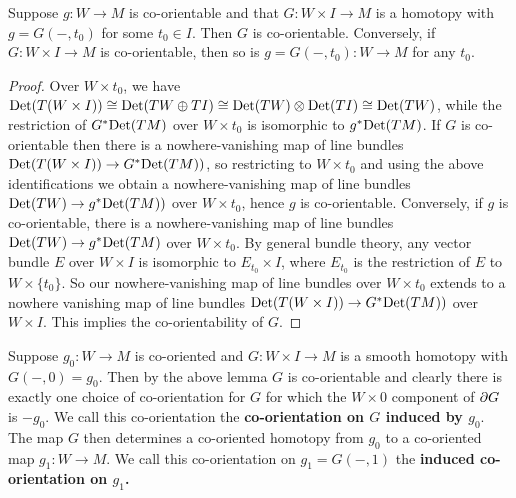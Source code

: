 \begin{lemma}\label{L: co-orientable homotopies}
	Suppose $g \colon W \to M$ is co-orientable and that $G \colon W \times I \to M$ is a homotopy with $g = G(-,t_0)$ for some $t_0 \in I$.
	Then $G$ is co-orientable.
	Conversely, if $G \colon W \times I \to M$ is co-orientable, then so is $g = G(-,t_0) \colon W \to M$ for any $t_0$.
\end{lemma}

\begin{proof}
	Over $W \times t_0$, we have ${\rm Det}(T(W \times I)) \cong {\rm Det}(TW \oplus TI) \cong {\rm Det}(TW) \otimes {\rm Det} (TI) \cong {\rm Det}(TW)$, while the restriction of $G^*{\rm Det}(TM)$ over $W \times t_0$ is isomorphic to $g^*{\rm Det}(TM)$.
	If $G$ is co-orientable then there is a nowhere-vanishing map of line bundles ${\rm Det}(T(W \times I)) \to G^*{\rm Det}(TM))$, so restricting to $W \times t_0$ and using the above identifications we obtain a nowhere-vanishing map of line bundles ${\rm Det}(TW) \to g^*{\rm Det}(TM))$ over $W \times t_0$, hence $g$ is co-orientable.
	Conversely,
	if $g$ is co-orientable, there is a nowhere-vanishing map of line bundles ${\rm Det}(TW) \to g^*{\rm Det}(TM)$ over $W \times t_0$.
	By general bundle theory, any vector bundle $E$ over $W \times I$ is isomorphic to $E_{t_0} \times I$, where $E_{t_0}$ is the restriction of $E$ to $W \times \{t_0\}$.
	So our nowhere-vanishing map of line bundles over $W \times t_0$ extends to a nowhere vanishing map of line bundles ${\rm Det}(T(W \times I)) \to G^*{\rm Det}(TM))$ over $W \times I$.
	This implies the co-orientability of $G$.
\end{proof}

\begin{definition}\label{D: homotopy co-orientation}
	Suppose $g_0 \colon W \to M$ is co-oriented and $G \colon W \times I \to M$ is a smooth homotopy with $G(-,0) = g_0$.
	Then by the above lemma $G$ is co-orientable and clearly there is exactly one choice of co-orientation for $G$ for which the $W \times 0$ component of $\partial G$ is $-g_0$.
	We call this co-orientation the \textbf{co-orientation on $G$ induced by $g_0$}.
	The map $G$ then determines a co-oriented homotopy from $g_0$ to a co-oriented map $g_1 \colon W \to M$.
	We call this co-orientation on $g_1 = G(-,1)$ the \textbf{induced co-orientation on $g_1$.}
\end{definition}

